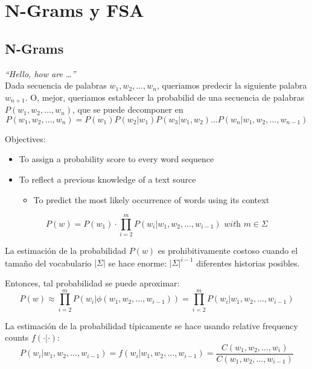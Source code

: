 \chapter{N-Grams y FSA}

\section{N-Grams}

\textit{``Hello, how are \dots''}\\
Dada secuencia de palabras $w_1, w_2, \ldots, w_n$, queriamos predecir la siguiente palabra $w_{n+1}$.
O, mejor, queriamos establecer la probabilid de una secuencia de palabras $P(w_1, w_2, \ldots, w_n)$, que se puede decomponer en
\begin{equation}
P(w_1, w_2, \ldots, w_n) = P(w_1) P(w_2|w_1) P(w_3|w_1, w_2) \ldots P(w_n|w_1, w_2, \ldots, w_{n-1})
\end{equation}


Objectives:
\begin{itemize}
	\item To assign a probability score to every word sequence
	\item To reflect a previous knowledge of a text source
   \begin{itemize}
	   \item To predict the most likely occurrence of words using its context
   \end{itemize}
\end{itemize}

\begin{equation}
   P(w) = P(w_1)\cdot \prod_{i=2}^{m}P(w_i|w_1, w_2, \ldots, w_{i-1}) \textit{ with } m \in \Sigma
\end{equation}

La estimación de la probabilidad $P(w)$ es prohibitivamente costoso cuando el tamaño del vocabulario $|\Sigma|$ 
se hace enorme: $|\Sigma|^{i-1}$ diferentes historias posibles.

Entonces, tal probabilidad se puede aproximar:
\begin{equation}
   P(w) \approx \prod_{i=2}^{m}P(w_i|\phi(w_1, w_2, \ldots, w_{i-1})) = \prod_{i=2}^{m}P(w_i|w_1, w_2, \ldots, w_{i-1})
\end{equation}

La estimación de la probabilidad típicamente se hace usando relative frequency counts $f(\cdot | \cdot)$:
\begin{equation}
   P(w_i|w_1, w_2, \ldots, w_{i-1}) = f(w_i|w_1, w_2, \ldots, w_{i-1}) =
   \frac{C(w_1, w_2, \ldots, w_i)}{C(w_1, w_2, \ldots, w_{i-1})}
\end{equation}

